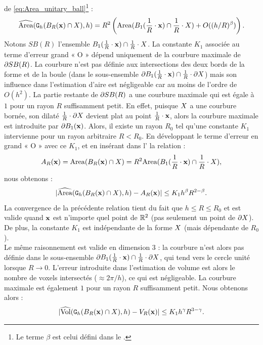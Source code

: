 de \ref{eq:Area_unitary_ball}\footnote{Le terme $\beta$ est celui défini dans le .} :
\begin{equation}
  \label{eq:Area_unitary_ball_shape}
  \AreaC(\DigF{\Ball{R}{\vx} \cap \Shape}{h}, h) = R^2 \left(\Area( \Ball{1}{\frac{1}{R} \cdot \vx} \cap \frac{1}{R} \cdot \Shape) + O( (h/R)^\beta) \right).
\end{equation}
%
Notons $SB(R)$ l'ensemble $\Ball{1}{\frac{1}{R} \cdot \vx} \cap \frac{1}{R} \cdot
\Shape$. La constante $K_1$ associée au terme d'erreur grand « O » dépend
uniquement de la courbure maximale de $\BT SB(R)$. La courbure n'est pas définie
aux intersections des deux bords de la forme et de la boule (dans le
sous-ensemble $\BT \Ball{1}{\frac{1}{R} \cdot \vx} \cap \frac{1}{R} \cdot \dS$) mais
son influence dans l'estimation d'aire est négligeable car au moins de l'ordre
de $O(h^2)$. La partie restante de $\BT SB(R)$ a une courbure maximale qui est
égale à $1$ pour un rayon $R$ suffisamment petit. En effet, puisque $\Shape$ a
une courbure bornée, son dilaté $\frac{1}{R} \cdot \dS$ devient plat au point
$\frac{1}{R} \cdot \vx$, alors la courbure maximale est introduite par $\BT
\Ball{1}{\vx}$. Alors, il existe un rayon $R_0$ tel qu'une constante $K_1$ intervienne pour un rayon arbitraire $R < R_0$. En développant le
terme d'erreur en grand « O » avec ce $K_1$, et en insérant dans
l' la relation :
%
\begin{equation}
  A_R(\vx) = \Area( \Ball{R}{\vx} \cap \Shape ) = R^2 \Area( \Ball{1}{\frac{1}{R} \cdot \vx} \cap \frac{1}{R} \cdot \Shape),
\end{equation}
%
nous obtenons :
%
\begin{equation}\label{eq:convergence-area-intersection}
  | \AreaC(\DigF{\Ball{R}{\vx} \cap \Shape}{h}, h) - A_R(\vx) | \le K_1 h^\beta R^{2-\beta}.
\end{equation}
%
La convergence de la précédente relation tient du fait que $h \le R \le R_0$ et
est valide quand $\vx$ est n'importe quel point de $\R^2$ (pas seulement un
point de $\dS$). De plus, la constante $K_1$ est indépendante de la forme
$\Shape$ (mais dépendante de $R_0$).\\
%
Le même raisonnement est valide en dimension 3 : la courbure n'est alors pas
définie dans le sous-ensemble $\BT \Ball{1}{\frac{1}{R} \cdot \vx} \cap \frac{1}{R}
\cdot \dS$, qui tend vers le cercle unité lorsque $R \rightarrow 0$. L'erreur
introduite dans l'estimation de volume est alors le nombre de voxels intersectés
($\approx 2\pi/h$), ce qui est négligeable. La courbure maximale est également
$1$ pour un rayon $R$ suffisamment petit. Nous obtenons alors :
%
\begin{equation}\label{eq:convergence-volume-intersection}
  | \VolC(\DigF{\Ball{R}{\vx} \cap \Shape}{h}, h) - V_R(\vx) | \le K_1 h^\gamma R^{3-\gamma}.
\end{equation}
%
